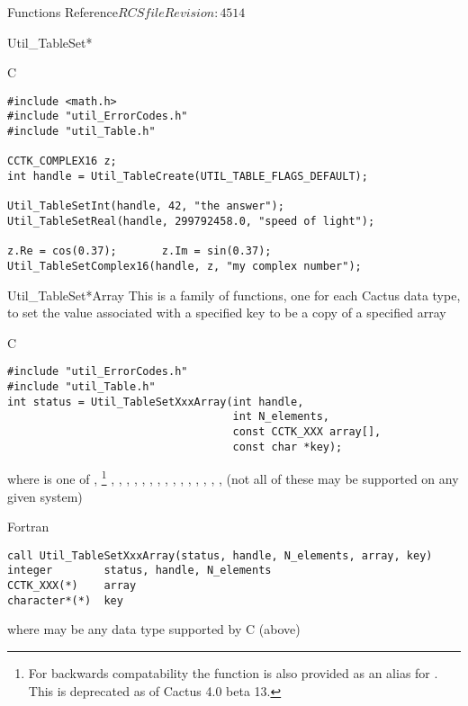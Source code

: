 \begin{cactuspart}{ Functions Reference}{$RCSfile$}{$Revision: 4514 $}
\begin{FunctionDescription}{Util\_TableSet*}
\begin{ExampleSection}
\begin{Example}{C}
\begin{verbatim}
#include <math.h>
#include "util_ErrorCodes.h"
#include "util_Table.h"

CCTK_COMPLEX16 z;
int handle = Util_TableCreate(UTIL_TABLE_FLAGS_DEFAULT);

Util_TableSetInt(handle, 42, "the answer");
Util_TableSetReal(handle, 299792458.0, "speed of light");

z.Re = cos(0.37);       z.Im = sin(0.37);
Util_TableSetComplex16(handle, z, "my complex number");
\end{verbatim}
\end{Example}
\end{ExampleSection}
\end{FunctionDescription}


\begin{FunctionDescription}{Util\_TableSet*Array}
\label{Util-TableSet*Array}
This is a family of functions, one for each Cactus data type,
to set the value associated with a specified key to be a copy
of a specified array

\begin{SynopsisSection}
\begin{Synopsis}{C}
\begin{verbatim}
#include "util_ErrorCodes.h"
#include "util_Table.h"
int status = Util_TableSetXxxArray(int handle,
                                   int N_elements,
                                   const CCTK_XXX array[],
                                   const char *key);
\end{verbatim}
where  is one of
   , %
\footnote{%
	 For backwards compatability the function
	  is also provided
	 as an alias for .
	 This is deprecated as of Cactus 4.0 beta 13.
	 }%
,
   , ,
   , , , , ,
   , , , ,
   , , , 
(not all of these may be supported on any given system)
\end{Synopsis}
\begin{Synopsis}{Fortran}
\begin{verbatim}
call Util_TableSetXxxArray(status, handle, N_elements, array, key)
integer        status, handle, N_elements
CCTK_XXX(*)    array
character*(*)  key
\end{verbatim}
where  may be any data type supported by C (above)
\end{Synopsis}
\end{SynopsisSection}


\end{FunctionDescription}
\end{cactuspart}
